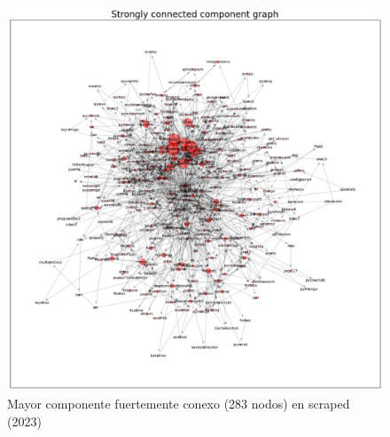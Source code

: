 \begin{figure}[h!]
    \begin{center}
        \includegraphics[width=1.2\textwidth]{img/pypi/scc1.png}
        \caption{Mayor componente fuertemente conexo (283 nodos) en scraped (2023)}
    \end{center}
\end{figure}

